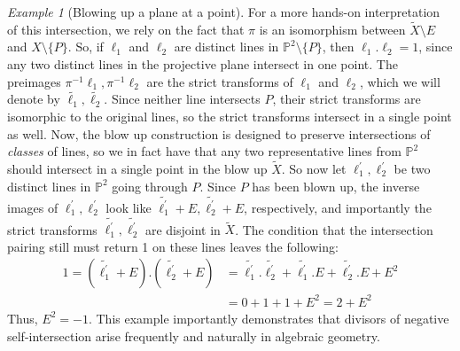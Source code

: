 \documentclass[12pt,twoside]{reedthesis}
\theoremstyle{plain}
\theoremstyle{definition}
\theoremstyle{remark}
\newtheorem{example}{Example}[section]
\newcommand{\Proj}{\mathbb{P}}
\begin{document}
\begin{example}[Blowing up a plane at a point]
For a more hands-on interpretation of this intersection, we rely on the fact that $\pi$ is an isomorphism between $\widetilde{X}\setminus E$ and $X\setminus \{P\}$. So, if $\ell_1$ and $\ell_2$ are distinct lines in $\Proj^2\setminus\{P\}$, then $\ell_1.\ell_2=1$, since any two distinct lines in the projective plane intersect in one point. The preimages $\pi^{-1}\ell_1,\pi^{-1}\ell_2$ are the strict transforms of $\ell_1$ and $\ell_2$, which we will denote by $\widetilde{\ell_1},\widetilde{\ell_2}$. Since neither line intersects $P$, their strict transforms are isomorphic to the original lines, so the strict transforms intersect in a single point as well. Now, the blow up construction is designed to preserve intersections of \emph{classes} of lines, so we in fact have that any two representative lines from $\Proj^2$ should intersect in a single point in the blow up $\widetilde{X}$. So now let $\ell_1^\prime,\ell_2^\prime$ be two distinct lines in $\Proj^2$ going through $P$. Since $P$ has been blown up, the inverse images of $\ell_1^\prime, \ell_2^\prime$ look like $\widetilde{\ell_1^\prime}+E,\widetilde{\ell_2^\prime}+E$, respectively, and importantly the strict transforms $\widetilde{\ell_1^\prime},\widetilde{\ell_2^\prime}$ are disjoint in $\widetilde{X}$. The condition that the intersection pairing still must return 1 on these lines leaves the following:
\begin{align*}
1=(\widetilde{\ell_1^\prime}+E).(\widetilde{\ell_2^\prime}+E)&=\widetilde{\ell_1^\prime}.\widetilde{\ell_2^\prime}+\widetilde{\ell_1^\prime}.E+\widetilde{\ell_2^\prime}.E+E^2\\
&=0+1+1+E^2=2+E^2
\end{align*}
Thus, $E^2=-1$. This example importantly demonstrates that divisors of negative self-intersection arise frequently and naturally in algebraic geometry.
\end{example}
\end{document}
